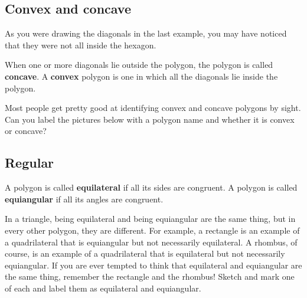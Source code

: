 \subsection{Convex and concave}

As you were drawing the diagonals in the last example,
you may have noticed that they were not all inside the hexagon.

When one or more diagonals lie outside the polygon,
the polygon is called \textbf{concave}.
A \textbf{convex} polygon is one in which all the diagonals lie inside the polygon.

Most people get pretty good at identifying convex and concave polygons by sight.
\q Can you label the pictures below with a polygon name and whether it is convex or concave?
	\begin{center}
	\hspace{1cm}
	\hspace{1cm}
	\end{center}

\subsection{Regular}

A polygon is called \textbf{equilateral} if all its sides are congruent.
A polygon is called \textbf{equiangular} if all its angles are congruent.

In a triangle, being equilateral and being equiangular are the same thing,
but in every other polygon, they are different. 
For example,
a rectangle is an example of a quadrilateral 
that is equiangular but not necessarily equilateral.
A rhombus, of course,
is an example of a quadrilateral that is equilateral but not
necessarily equiangular.
If you are ever tempted to think that equilateral and equiangular are the same thing,
remember the rectangle and the rhombus! \q Sketch and mark one of each and label them as equilateral and equiangular.

